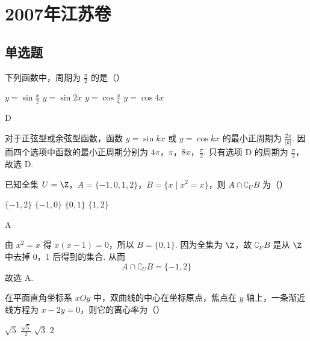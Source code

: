 
\chapter{2007年江苏卷}

\section{单选题}

\begin{problem}
下列函数中，周期为 \(\frac{\pi}{2}\) 的是（\quad）

\choices
    {\(y = \sin \frac{x}{2}\)}
    {\(y = \sin 2x\)}
    {\(y = \cos \frac{x}{4}\)}
    {\(y = \cos 4x\)}
\end{problem}

\begin{answer}
D
\end{answer}

\begin{solution}
对于正弦型或余弦型函数，函数 \(y=\sin kx\) 或 \(y=\cos kx\) 的最小正周期为 \(\frac{2\pi}{|k|}\). 因而四个选项中函数的最小正周期分别为 \(4\pi\)，\(\pi\)，\(8\pi\)，\(\frac{\pi}{2}\). 只有选项 D 的周期为 \(\frac{\pi}{2}\)，故选 D.
\end{solution}

\begin{problem}
已知全集 \(U = \Z\)，\(A = \{-1, 0, 1, 2\}\)，\(B = \{x \mid x^{2} = x\}\)，则 \(A \cap \complement_U B\) 为（\quad）

\choices
    {\(\{-1, 2\}\)}
    {\(\{-1, 0\}\)}
    {\(\{0, 1\}\)}
    {\(\{1, 2\}\)}
\end{problem}

\begin{answer}
A
\end{answer}

\begin{solution}
由 \(x^{2}=x\) 得 \(x(x-1)=0\)，所以 \(B=\{0,1\}\). 因为全集为 \(\Z\)，故 \(\complement_U B\) 是从 \(\Z\) 中去掉 \(0\)，\(1\) 后得到的集合. 从而
\[
A\cap\complement_U B=\{-1,2\}
\]
故选 A.
\end{solution}

\begin{problem}
在平面直角坐标系 \(xOy\) 中，双曲线的中心在坐标原点，焦点在 \(y\) 轴上，一条渐近线方程为 \(x - 2y = 0\)，则它的离心率为（\quad）

\choices
    {\(\sqrt{5}\)}
    {\(\frac{\sqrt{5}}{2}\)}
    {\(\sqrt{3}\)}
    {\(2\)}
\end{problem}

